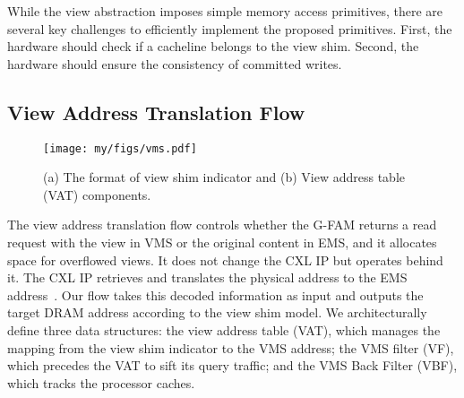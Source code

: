 







\ifx\stale\undefined
While the view abstraction imposes simple memory access primitives, there are several key challenges to efficiently implement the proposed primitives. 
First, the hardware should check if a cacheline belongs to the view shim. 
Second, the hardware should ensure the consistency of committed writes. 
\fi



\subsection{View Address Translation Flow}      \label{subsec:vat}

\begin{figure}[t]
  \centering
  \texttt{[image: my/figs/vms.pdf]}
  \caption{(a) The format of view shim indicator and (b) View address table (VAT) components. }
  \label{fig:vms}
\end{figure}


The view address translation flow controls whether the G-FAM returns a read request with the view in VMS or the original content in EMS, and it allocates space for overflowed views. It does not change the CXL IP but operates behind it. The CXL IP retrieves and translates the physical address to the EMS address~\cite{cxl-fpga-doc, cxl-doc}. 
Our flow takes this decoded information as input and outputs the target DRAM address according to the view shim model. We architecturally define three data structures: the view address table (VAT), which manages the mapping from the view shim indicator to the VMS address; the VMS filter (VF), which precedes the VAT to sift its query traffic; and the VMS Back Filter (VBF), which tracks the processor caches.


